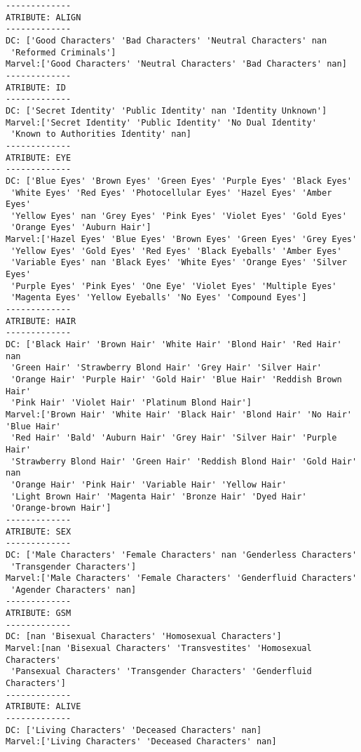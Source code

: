 \documentclass[11pt]{article}
\begin{document}
    \begin{Verbatim}[commandchars=\\\{\}]
-------------
ATRIBUTE: ALIGN
-------------
DC: ['Good Characters' 'Bad Characters' 'Neutral Characters' nan
 'Reformed Criminals'] 
Marvel:['Good Characters' 'Neutral Characters' 'Bad Characters' nan]
-------------
ATRIBUTE: ID
-------------
DC: ['Secret Identity' 'Public Identity' nan 'Identity Unknown'] 
Marvel:['Secret Identity' 'Public Identity' 'No Dual Identity'
 'Known to Authorities Identity' nan]
-------------
ATRIBUTE: EYE
-------------
DC: ['Blue Eyes' 'Brown Eyes' 'Green Eyes' 'Purple Eyes' 'Black Eyes'
 'White Eyes' 'Red Eyes' 'Photocellular Eyes' 'Hazel Eyes' 'Amber Eyes'
 'Yellow Eyes' nan 'Grey Eyes' 'Pink Eyes' 'Violet Eyes' 'Gold Eyes'
 'Orange Eyes' 'Auburn Hair'] 
Marvel:['Hazel Eyes' 'Blue Eyes' 'Brown Eyes' 'Green Eyes' 'Grey Eyes'
 'Yellow Eyes' 'Gold Eyes' 'Red Eyes' 'Black Eyeballs' 'Amber Eyes'
 'Variable Eyes' nan 'Black Eyes' 'White Eyes' 'Orange Eyes' 'Silver Eyes'
 'Purple Eyes' 'Pink Eyes' 'One Eye' 'Violet Eyes' 'Multiple Eyes'
 'Magenta Eyes' 'Yellow Eyeballs' 'No Eyes' 'Compound Eyes']
-------------
ATRIBUTE: HAIR
-------------
DC: ['Black Hair' 'Brown Hair' 'White Hair' 'Blond Hair' 'Red Hair' nan
 'Green Hair' 'Strawberry Blond Hair' 'Grey Hair' 'Silver Hair'
 'Orange Hair' 'Purple Hair' 'Gold Hair' 'Blue Hair' 'Reddish Brown Hair'
 'Pink Hair' 'Violet Hair' 'Platinum Blond Hair'] 
Marvel:['Brown Hair' 'White Hair' 'Black Hair' 'Blond Hair' 'No Hair' 'Blue Hair'
 'Red Hair' 'Bald' 'Auburn Hair' 'Grey Hair' 'Silver Hair' 'Purple Hair'
 'Strawberry Blond Hair' 'Green Hair' 'Reddish Blond Hair' 'Gold Hair' nan
 'Orange Hair' 'Pink Hair' 'Variable Hair' 'Yellow Hair'
 'Light Brown Hair' 'Magenta Hair' 'Bronze Hair' 'Dyed Hair'
 'Orange-brown Hair']
-------------
ATRIBUTE: SEX
-------------
DC: ['Male Characters' 'Female Characters' nan 'Genderless Characters'
 'Transgender Characters'] 
Marvel:['Male Characters' 'Female Characters' 'Genderfluid Characters'
 'Agender Characters' nan]
-------------
ATRIBUTE: GSM
-------------
DC: [nan 'Bisexual Characters' 'Homosexual Characters'] 
Marvel:[nan 'Bisexual Characters' 'Transvestites' 'Homosexual Characters'
 'Pansexual Characters' 'Transgender Characters' 'Genderfluid Characters']
-------------
ATRIBUTE: ALIVE
-------------
DC: ['Living Characters' 'Deceased Characters' nan] 
Marvel:['Living Characters' 'Deceased Characters' nan]

    \end{Verbatim}
\end{document}
